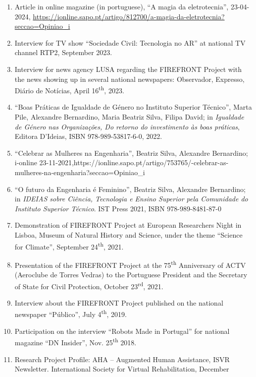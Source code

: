\begin{enumerate}
\def\labelenumi{\arabic{enumi}.}
\item
  Article in online magazine (in portuguese), ``A magia da
  eletrotecnia'', 23-04-2024,
  \url{https://ionline.sapo.pt/artigo/812700/a-magia-da-eletrotecnia?seccao=Opiniao_i}
\item
  Interview for TV show ``Sociedade Civil: Tecnologia no AR'' at
  national TV channel RTP2, September 2023.
\item
  Interview for news agency LUSA regarding the FIREFRONT Project with
  the news showing up in several national newspapers: Observador,
  Expresso, Diário de Notícias, April 16\textsuperscript{th}, 2023.
\item
  ``Boas Práticas de Igualdade de Género no Instituto Superior
  Técnico'', Marta Pile, Alexandre Bernardino, Maria Beatriz Silva,
  Filipa David; in \emph{Igualdade de Género nas Organizações, Do
  retorno do investimento às boas práticas}, Editora D'Ideias, ISBN
  978-989-53817-6-0, 2022.
\item
  ``Celebrar as Mulheres na Engenharia'', Beatriz Silva, Alexandre
  Bernardino; i-online
  23-11-2021,https://ionline.sapo.pt/artigo/753765/-celebrar-as-mulheres-na-engenharia?seccao=Opiniao\_i
\item
  ``O futuro da Engenharia é Feminino'', Beatriz Silva, Alexandre
  Bernardino; in \emph{IDEIAS sobre Ciência, Tecnologia e Ensino
  Superior pela Comunidade do Instituto Superior Técnico}. IST Press
  2021, ISBN 978-989-8481-87-0
\item
  Demonstration of FIREFRONT Project at European Researchers Night in
  Lisboa, Museum of Natural History and Science, under the theme
  ``Science for Climate'', September 24\textsuperscript{th}, 2021.
\item
  Presentation of the FIREFRONT Project at the 75\textsuperscript{th}
  Anniversary of ACTV (Aeroclube de Torres Vedras) to the Portuguese
  President and the Secretary of State for Civil Protection, October
  23\textsuperscript{rd}, 2021.
\item
  Interview about the FIREFRONT Project published on the national
  newspaper ``Público'', July 4\textsuperscript{th}, 2019.
\item
  Participation on the interview ``Robots Made in Portugal'' for
  national magazine ``DN Insider'', Nov. 25\textsuperscript{th} 2018.
\item
  Research Project Profile: AHA -- Augmented Human Assistance, ISVR
  Newsletter. International Society for Virtual Rehabilitation, December

\end{enumerate}
